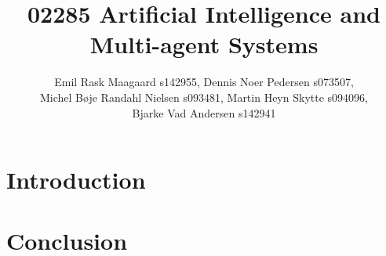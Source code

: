 \documentclass[a4paper,12pt]{article}
\title{02285 Artificial Intelligence and Multi-agent Systems}
\author{Emil Rask Maagaard s142955, Dennis Noer Pedersen s073507,\\ 
  Michel B\o je Randahl Nielsen s093481, Martin Heyn Skytte s094096,\\
  Bjarke Vad Andersen s142941}
\begin{document}
\maketitle{}

\section*{Introduction}


\section*{Conclusion}

\end{document}
